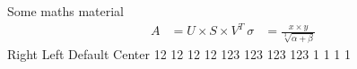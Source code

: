 {}\markdownRendererInterblockSeparator
{}\markdownRendererUlBegin
\markdownRendererUlItem Some maths material\markdownRendererUlItemEnd 
\markdownRendererUlEnd \markdownRendererInterblockSeparator
{}\begin{align} A &= U \times S \times V^T\ \sigma &= \frac{x\times y}{\sqrt[3]{\alpha + \beta}} \end{align}\markdownRendererInterblockSeparator
{}\markdownRendererHorizontalRule{}\markdownRendererInterblockSeparator
{}\markdownRendererInterblockSeparator
{}%
{{Right}%
{Left}%
{Default}%
{Center}%
}%
{{12}%
{12}%
{12}%
{12}%
}%
{{123}%
{123}%
{123}%
{123}%
}%
{{1}%
{1}%
{1}%
{1}%
}%
\markdownRendererInterblockSeparator
{}\markdownRendererHorizontalRule{}\relax